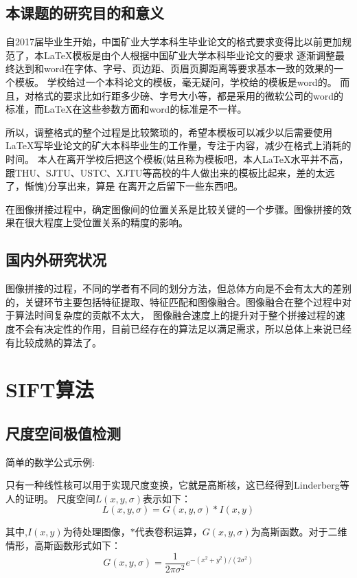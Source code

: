 \documentclass[10.5pt,a4paper]{article}
\numberwithin{equation}{section}
\numberwithin{figure}{section}
\numberwithin{table}{section}
\begin{document}
\subsection{本课题的研究目的和意义}
自2017届毕业生开始，中国矿业大学本科生毕业论文的格式要求变得比以前更加规范了，本\LaTeX{}模板是由个人根据中国矿业大学本科毕业论文的要求%
逐渐调整最终达到和word在字体、字号、页边距、页眉页脚距离等要求基本一致的效果的一个模板。
学校给过一个本科论文的模板，毫无疑问，学校给的模板是word的。
而且，对格式的要求比如行距多少磅、字号大小等，都是采用的微软公司的word的标准，而\LaTeX{}在这些参数方面和word的标准是不一样。
\par
所以，调整格式的整个过程是比较繁琐的，希望本模板可以减少以后需要使用\LaTeX{}写毕业论文的矿大本科毕业生的工作量，专注于内容，减少在格式上消耗的时间。
本人在离开学校后把这个模板(姑且称为模板吧，本人\LaTeX{}水平并不高，跟THU、SJTU、USTC、XJTU等高校的牛人做出来的模板比起来，差的太远了，惭愧)分享出来，算是%
在离开之后留下一些东西吧。
\par
在图像拼接过程中，确定图像间的位置关系是比较关键的一个步骤。图像拼接的效果在很大程度上受位置关系的精度的影响\cite{zagrouba2009efficient,chen2014optimization}。\par
\subsection{国内外研究状况}
图像拼接的过程，不同的学者有不同的划分方法，但总体方向是不会有太大的差别的，关键环节主要包括特征提取、特征匹配和图像融合。图像融合在整个过程中对于算法时间复杂度的贡献不太大，%
图像融合速度上的提升对于整个拼接过程的速度不会有决定性的作用，目前已经存在的算法足以满足需求，所以总体上来说已经有比较成熟的算法了。
\newpage
\section{SIFT算法\label{sectionSift}}

\subsection{尺度空间极值检测}

简单的数学公式示例:\par
只有一种线性核可以用于实现尺度变换，它就是高斯核，这已经得到Linderberg等人的证明\cite{lindeberg1994scale}。
尺度空间$L(x,y,\sigma)$表示如下：
\begin{equation}
L(x,y,\sigma) = G(x,y,\sigma) * I(x,y)
\end{equation}
\par
其中,$I(x,y)$为待处理图像，$*$代表卷积运算，$G(x,y,\sigma)$为高斯函数\cite{lowe2004distinctive}。对于二维情形，高斯函数形式如下：
\begin{equation}
G(x,y,\sigma) = \frac{1}{2\pi\sigma^2}e^{-(x^2+y^2)/(2\sigma^2)}
\end{equation}
\end{document}
